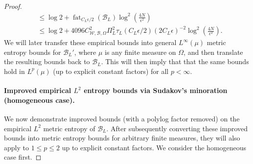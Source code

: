 \documentclass{article}
\DeclareMathOperator{\fat}{\mathrm{fat}}
\def\cB{{\mathcal{B}}}
\def\cW{{\mathcal{W}}}
\begin{document}
\begin{appendices}
\begin{proof}
\begin{align}
        &\leq \log 2 + \fat_{C_L \epsilon/2} (\cB_L) \log^2 \left( \frac{4N}{\epsilon^2} \right) \\
        &\leq \log 2 +  4096 C_{\cW, \cB, \Omega}^2 \Pi_L^2 \tau_L(C_L \epsilon/2) (2 C_L \epsilon)^{-2} \log^2 \left( \frac{4N}{\epsilon^2} \right).
    \end{align}
    We will later transfer these empirical bounds into general $L^\infty(\mu)$ metric entropy bounds for $\cB_L'$, where $\mu$ is any finite measure on $\Omega$, and then translate the resulting bounds back to $\cB_L$. This will then imply that that the same bounds hold in $L^p(\mu)$ (up to explicit constant factors) for all $p < \infty$.

    

    \paragraph{Improved empirical $L^2$ entropy bounds via Sudakov's minoration (homogeneous case).} We now demonstrate improved bounds (with a polylog factor removed) on the empirical $L^2$ metric entropy of $\cB_L$. After subsequently converting these improved bounds into metric entropy bounds for arbitrary finite measures, they will also apply to $1 \leq p \leq 2$ up to explicit constant factors. We consider the homogeneous case first. 
    

\end{proof}
\end{appendices}
\end{document}
